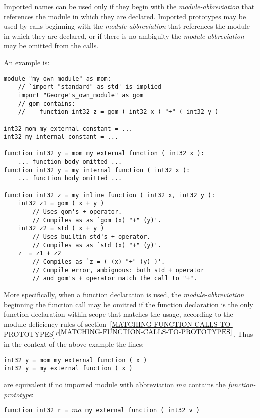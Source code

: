 \documentclass[12pt]{article}
\newcommand{\itemref}[1]{\ref{#1}$^{p\pageref{#1}}$}
\newenvironment{indpar}[1][0.3in]%
	{\begin{list}{}%
		     {\setlength{\itemsep}{0in}%
		      \setlength{\topsep}{0in}%
		      \setlength{\parsep}{1ex}%
		      \setlength{\labelwidth}{#1}%
		      \setlength{\leftmargin}{#1}%
		      \addtolength{\leftmargin}{\labelsep}}%
	 \item}%
	{\end{list}}
\begin{document}
Imported names can be used only if they begin
with the {\em module-abbreviation} that references the module in which
they are declared.  Imported prototypes may be used by calls beginning with
the {\em module-abbreviation} that references the module in which
they are declared, or if there is no ambiguity the {\em module-abbreviation}
may be omitted from the calls.

An example is:
\begin{indpar}\begin{verbatim}
module "my_own_module" as mom:
    // `import "standard" as std' is implied
    import "George's_own_module" as gom
    // gom contains:
    //    function int32 z = gom ( int32 x ) "+" ( int32 y )

int32 mom my external constant = ...
int32 my internal constant = ...

function int32 y = mom my external function ( int32 x ):
    ... function body omitted ...
function int32 y = my internal function ( int32 x ):
    ... function body omitted ...

function int32 z = my inline function ( int32 x, int32 y ):
    int32 z1 = gom ( x + y )
        // Uses gom's + operator.
        // Compiles as as `gom (x) "+" (y)'.
    int32 z2 = std ( x + y )
        // Uses builtin std's + operator.
        // Compiles as as `std (x) "+" (y)'.
    z  = z1 + z2 
        // Compiles as `z = ( (x) "+" (y) )'.
        // Compile error, ambiguous: both std + operator
        // and gom's + operator match the call to "+".
\end{verbatim}\end{indpar}\label{EXTERNAL-INTERNAL-EXAMPLE}

More specifically,
when a function declaration is used, the {\em module-abbreviation}
beginning the function call may be omitted if the function declaration is
the only function declaration within scope that matches the usage,
according to the module deficiency rules of
section~\itemref{MATCHING-FUNCTION-CALLS-TO-PROTOTYPES}.
Thus in the context of the above example the lines:
\begin{indpar}\begin{verbatim}
int32 y = mom my external function ( x )
int32 y = my external function ( x )
\end{verbatim}\end{indpar}
are equivalent if no imported module with abbreviation $ma$
contains the {\em function-prototype}:
\begin{center}
\tt function int32 r = $ma$ my external function ( int32 v )
\end{center}
\end{document}
